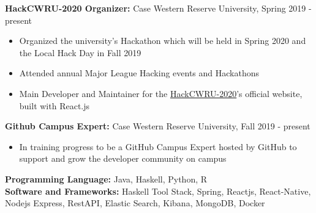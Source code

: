 \documentclass[a4paper,11pt]{article}
\begin{document}
\begin{flushleft}
	
	\textbf{HackCWRU-2020 Organizer: } Case Western Reserve University, Spring 2019 - 
	present
	\vspace{-\topsep}
	\begin{itemize}
		\setlength{\parskip}{2pt}
		\setlength{\itemsep}{0pt plus 1pt}
		\item Organized the university's Hackathon which will be held in Spring 2020 and the Local Hack Day in Fall 2019 \\
		\item Attended annual Major League Hacking events and Hackathons
		\item Main Developer and Maintainer for the \href{https://hackcwru.github.io/HackCWRU2020-Website/}{HackCWRU-2020}'s official website, built with React.js
	\end{itemize}
	
	
	\textbf{Github Campus Expert: } Case Western Reserve University, Fall 2019 - present
	\vspace{-\topsep}
		\begin{itemize}
			\setlength{\parskip}{2pt}
			\setlength{\itemsep}{0pt plus 10pt}
			\item In training progress to be a GitHub Campus Expert hosted by GitHub to support and grow the developer community on campus
		\end{itemize}
\centering{\noindent\makebox{\rule{8cm}{1.5pt}}}
\end{flushleft} 
\begin{flushleft}
	\textbf{Programming Language:} Java, Haskell, Python, R \\ 
	\doublespacing
	\textbf{Software and Frameworks:} Haskell Tool Stack, Spring, Reactjs, React-Native, Nodejs Express, RestAPI, Elastic Search, Kibana, MongoDB, Docker \\
	\vspace{-\topsep}
	
\end{flushleft}
\end{document}
